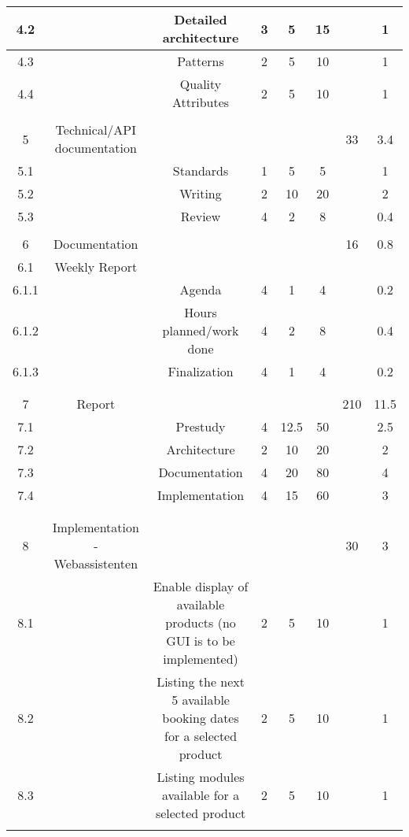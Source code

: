 \begin{table}
\begin{tabular}{|c|c|c|c|c|c|c|c|}
\hline
4.2 &  & Detailed architecture & 3 & 5 & 15 &  & 1\\ 
\hline
4.3 &  & Patterns & 2 & 5 & 10 &  & 1\\ 
\hline
4.4 &  & Quality Attributes & 2 & 5 & 10 &  & 1\\ 
\hline
 &  &  &  &  &  &  & \\ 
\hline
5 & Technical/API documentation &  &  &  &  & 33 & 3.4\\ 
\hline
5.1 &  & Standards & 1 & 5 & 5 &  & 1\\ 
\hline
5.2 &  & Writing & 2 & 10 & 20 &  & 2\\ 
\hline
5.3 &  & Review & 4 & 2 & 8 &  & 0.4\\ 
\hline
 &  &  &  &  &  &  & \\ 
\hline
6 & Documentation &  &  &  &  & 16 & 0.8\\ 
\hline
6.1 & Weekly Report &  &  &  &  &  & \\ 
\hline
6.1.1 &  & Agenda & 4 & 1 & 4 &  & 0.2\\ 
\hline
6.1.2 &  & Hours planned/work done & 4 & 2 & 8 &  & 0.4\\ 
\hline
6.1.3 &  & Finalization & 4 & 1 & 4 &  & 0.2\\ 
\hline
 &  &  &  &  &  &  & \\ 
\hline
 &  &  &  &  &  &  & \\ 
\hline
7 & Report &  &  &  &  & 210 & 11.5\\ 
\hline
7.1 &  & Prestudy & 4 & 12.5 & 50 &  & 2.5\\ 
\hline
7.2 &  & Architecture & 2 & 10 & 20 &  & 2\\ 
\hline
7.3 &  & Documentation & 4 & 20 & 80 &  & 4\\ 
\hline
7.4 &  & Implementation & 4 & 15 & 60 &  & 3\\ 
\hline
 &  &  &  &  &  &  & \\ 
\hline
 &  &  &  &  &  &  & \\ 
\hline
8 & Implementation - Webassistenten &  &  &  &  & 30 & 3\\ 
\hline
8.1 &  & Enable display of available products (no GUI is to be implemented) & 2 & 5 & 10 &  & 1\\ 
\hline
8.2 &  & Listing the next 5 available booking dates for a selected product & 2 & 5 & 10 &  & 1\\ 
\hline
8.3 &  & Listing modules available for a selected product & 2 & 5 & 10 &  & 1\\ 
\hline
 &  &  &  &  &  &  & \\ 

\end{tabular}
\end{table}
